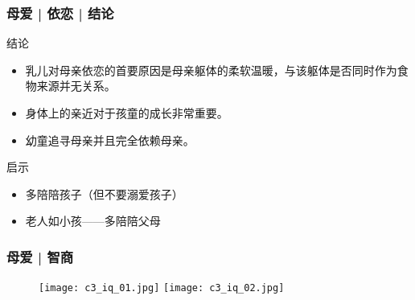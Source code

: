 \begin{frame}
  \frametitle{母爱 | 依恋 | 结论}
  \begin{block}{结论}
    \begin{itemize}
      \item 乳儿对母亲依恋的首要原因是母亲躯体的柔软温暖，与该躯体是否同时作为食物来源并无关系。
      \item 身体上的亲近对于孩童的成长非常重要。
      \item 幼童追寻母亲并且完全依赖母亲。
    \end{itemize}
  \end{block}
  \pause
  \begin{block}{启示}
    \begin{itemize}
      \item 多陪陪孩子（但不要溺爱孩子）
      \item 老人如小孩——多陪陪父母
    \end{itemize}
  \end{block}
\end{frame}

\begin{frame}
  \frametitle{母爱 | 智商}
  \begin{figure}
    \centering
    \texttt{[image: c3\_iq\_01.jpg]}
    \texttt{[image: c3\_iq\_02.jpg]}
  \end{figure}
\end{frame}

